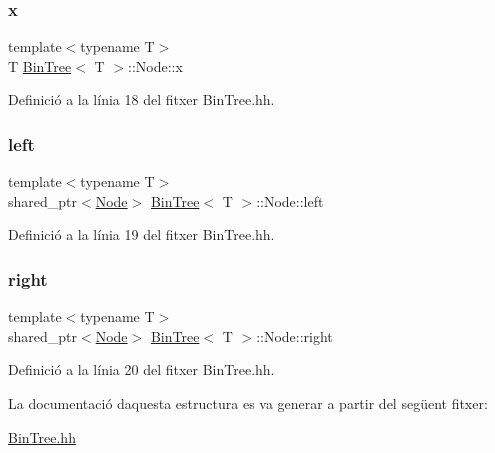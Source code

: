 \subsubsection{\texorpdfstring{x}{x}}
{\footnotesize\ttfamily template$<$typename T$>$ \\
T \hyperlink{class_bin_tree}{Bin\+Tree}$<$ T $>$\+::Node\+::x}



Definició a la línia 18 del fitxer Bin\+Tree.\+hh.

\mbox{\label{struct_bin_tree_1_1_node_a265a6367635a38838e6a6366564be78d}} 
\subsubsection{\texorpdfstring{left}{left}}
{\footnotesize\ttfamily template$<$typename T$>$ \\
shared\+\_\+ptr$<$\hyperlink{struct_bin_tree_1_1_node}{Node}$>$ \hyperlink{class_bin_tree}{Bin\+Tree}$<$ T $>$\+::Node\+::left}



Definició a la línia 19 del fitxer Bin\+Tree.\+hh.

\mbox{\label{struct_bin_tree_1_1_node_a6df770137090da60cd0376ce06893cbd}} 
\subsubsection{\texorpdfstring{right}{right}}
{\footnotesize\ttfamily template$<$typename T$>$ \\
shared\+\_\+ptr$<$\hyperlink{struct_bin_tree_1_1_node}{Node}$>$ \hyperlink{class_bin_tree}{Bin\+Tree}$<$ T $>$\+::Node\+::right}



Definició a la línia 20 del fitxer Bin\+Tree.\+hh.



La documentació d\textquotesingle{}aquesta estructura es va generar a partir del següent fitxer\+:\begin{DoxyCompactItemize}
\item 
\hyperlink{_bin_tree_8hh}{Bin\+Tree.\+hh}\end{DoxyCompactItemize}
